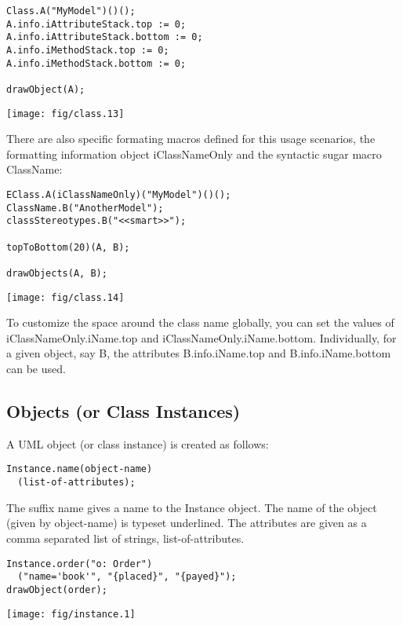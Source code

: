 \documentclass{article}
\newcommand{\code}{\ttfamily}
\begin{document}
\begin{multicols}{2}
\begin{verbatim}
Class.A("MyModel")()();
A.info.iAttributeStack.top := 0;
A.info.iAttributeStack.bottom := 0;
A.info.iMethodStack.top := 0;
A.info.iMethodStack.bottom := 0;

drawObject(A);
\end{verbatim}
\columnbreak
\hspace{1cm}\texttt{[image: fig/class.13]}
\end{multicols}

There are also specific formating macros defined for this usage scenarios, the formatting information object {\code iClassNameOnly} and the syntactic sugar macro {\code ClassName}:

\begin{multicols}{2}
\begin{verbatim}
EClass.A(iClassNameOnly)("MyModel")()();
ClassName.B("AnotherModel");
classStereotypes.B("<<smart>>");

topToBottom(20)(A, B);

drawObjects(A, B);
\end{verbatim}
\columnbreak
\hspace{2cm}\texttt{[image: fig/class.14]}
\end{multicols}

To customize the space around the class name globally, you can set the values of {\code iClassNameOnly.iName.top} and {\code iClassNameOnly.iName.bottom}. Individually, for a given object, say {\code B}, the attributes {\code B.info.iName.top} and {\code B.info.iName.bottom} can be used.

\subsection{Objects (or Class Instances)}

A UML object (or class instance) is created as follows:

\begin{verbatim}
Instance.name(object-name)
  (list-of-attributes);
\end{verbatim}

The suffix {\code name} gives a name to the {\code Instance} object. The name of the object (given by {\code object-name}) is typeset underlined. The attributes are given as a comma separated list of strings, {\code list-of-attributes}.

\begin{multicols}{2}
\begin{verbatim}
Instance.order("o: Order")
  ("name='book'", "{placed}", "{payed}");
drawObject(order);
\end{verbatim}
\columnbreak
\hspace{2cm}\texttt{[image: fig/instance.1]}
\end{multicols}
\end{document}

